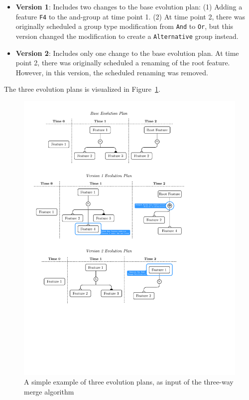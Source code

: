 \documentclass[a4paper,english]{ifimaster}
\begin{document}
\begin{itemize}
  \item \textbf{Version 1}: Includes two changes to the base evolution plan: (1) Adding a feature \texttt{F4} to the and-group at time point 1. (2) At time point 2, there was originally scheduled a group type modification from \texttt{And} to \texttt{Or}, but this version changed the modification to create a \texttt{Alternative} group instead.
  \item \textbf{Version 2}: Includes only one change to the base evolution plan. At time point 2, there was originally scheduled a renaming of the root feature. However, in this version, the scheduled renaming was removed.
\end{itemize}

The three evolution plans is visualized in Figure~\ref{fig:simple_three_way_example}. 

\begin{figure}[htpb]
  \centering
  \includegraphics[width=\linewidth]{simple_three_way_example.pdf}
  \caption{A simple example of three evolution plans, as input of the three-way merge algorithm}%
  \label{fig:simple_three_way_example}
\end{figure}
\end{document}
